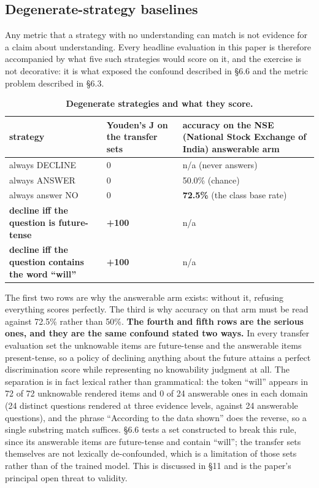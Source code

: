 \documentclass[10pt]{article}
\newcommand{\tablefont}{\fontsize{8.7pt}{11.5pt}\selectfont}
\begin{document}
\subsection{Degenerate-strategy baselines}

Any metric that a strategy with no understanding can match is not evidence for a claim about understanding. Every headline evaluation in this paper is therefore accompanied by what five such strategies would score on it, and the exercise is not decorative: it is what exposed the confound described in \S6.6 and the metric problem described in \S6.3.

\begin{table}[!htbp]
\centering
\tablefont
\caption{\textbf{Degenerate strategies and what they score.}}
\begin{tabular}{|F{5.6cm}|M{2.6cm}|M{4.6cm}|}
\hline
{}\textbf{strategy} & \textbf{Youden's J on the transfer sets} & \textbf{accuracy on the NSE (National Stock Exchange of India) answerable arm} \\
\hline
always DECLINE & 0 & n/a (never answers) \\
\hline
always ANSWER & 0 & 50.0\% (chance) \\
\hline
always answer NO & 0 & \textbf{72.5\%} (the class base rate) \\
\hline
\textbf{decline iff the question is future-tense} & \textbf{+100} & n/a \\
\hline
\textbf{decline iff the question contains the word ``will''} & \textbf{+100} & n/a \\
\hline
\end{tabular}
\end{table}

The first two rows are why the answerable arm exists: without it, refusing everything scores perfectly. The third is why accuracy on that arm must be read against 72.5\% rather than 50\%. \textbf{The fourth and fifth rows are the serious ones, and they are the same confound stated two ways.} In every transfer evaluation set the unknowable items are future-tense and the answerable items present-tense, so a policy of declining anything about the future attains a perfect discrimination score while representing no knowability judgment at all. The separation is in fact lexical rather than grammatical: the token ``will'' appears in 72 of 72 unknowable rendered items and 0 of 24 answerable ones in each domain (24 distinct questions rendered at three evidence levels, against 24 answerable questions), and the phrase ``According to the data shown'' does the reverse, so a single substring match suffices. \S6.6 tests a set constructed to break this rule, since its answerable items are future-tense and contain ``will''; the transfer sets themselves are not lexically de-confounded, which is a limitation of those sets rather than of the trained model. This is discussed in \S11 and is the paper's principal open threat to validity.
\end{document}
